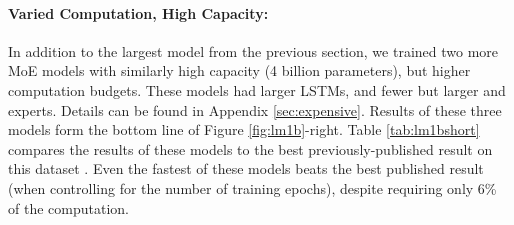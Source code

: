 \documentclass{article} \pdfoutput=1
\begin{document}
\begin{table}[!htbp]
\caption{ Summary of high-capacity MoE-augmented models with varying computational budgets, vs. best previously published results \citep{RafalNoam16}.  Details in Appendix \ref{sec:appendixlm1b}.}
\label{tab:lm1bshort}
\begin{center}
\setlength\tabcolsep{3pt}
\end{center}
\end{table}

\paragraph{Varied Computation, High Capacity:}  In addition to the largest model from the previous section, we trained two more MoE models with similarly high capacity (4 billion parameters), but higher computation budgets.  These models had larger LSTMs, and fewer but larger and experts.  Details can be found in Appendix \ref{sec:expensive}.  Results of these three models form the bottom line of Figure \ref{fig:lm1b}-right.  Table \ref{tab:lm1bshort} compares the results of these models to the best previously-published result on this dataset .  Even the fastest of these models beats the best published result (when controlling for the number of training epochs), despite requiring only 6\% of the computation.  
\end{document}
